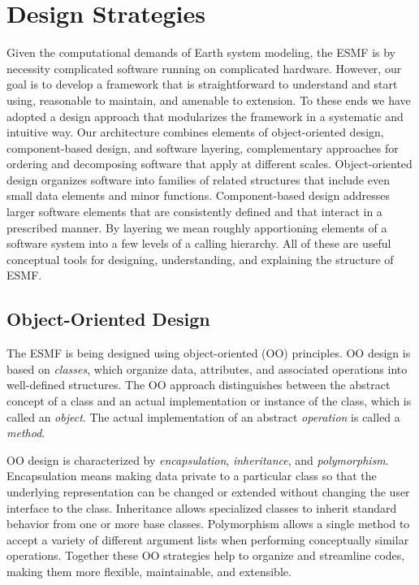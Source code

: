 \section{Design Strategies}

Given the computational demands of Earth system modeling, the ESMF is by 
necessity complicated software running on complicated hardware.  However,
our goal is to develop a framework that is straightforward to understand and 
start using, reasonable to maintain, and amenable to extension.  To these 
ends we have adopted a design approach that modularizes the framework in a 
systematic and intuitive way.  Our architecture combines elements of 
object-oriented design, component-based design, and software layering, 
complementary approaches for ordering and decomposing software that apply
at different scales.  Object-oriented design organizes software into families 
of related structures that include even 
small data elements and minor functions.  Component-based design addresses 
larger software elements that are consistently defined and that interact
in a prescribed manner.  By layering we mean roughly apportioning elements 
of a software system into a few levels of a calling hierarchy.
All of these are useful conceptual tools for designing, understanding, and
explaining the structure of ESMF.

\subsection{Object-Oriented Design}

The ESMF is being designed using object-oriented (OO) principles.  OO design
is based on {\it classes}, which organize data, attributes, and associated 
operations into well-defined structures.  The OO approach distinguishes between 
the abstract concept of a class and an actual implementation or instance of the 
class, which is called an {\it object}.  The actual implementation of an 
abstract {\it operation} is called a {\it method}.

OO design is characterized by {\it encapsulation}, {\it inheritance}, and 
{\it polymorphism}.  Encapsulation means making data 
private to a particular class so that the underlying representation
can be changed or extended without changing the user interface to the class.
Inheritance allows specialized classes to inherit standard behavior from one
or more base
classes.  Polymorphism allows a single method to accept a variety of 
different argument lists when performing conceptually similar operations.  
Together these OO strategies help to organize and streamline codes, making 
them more flexible, maintainable, and extensible. 

